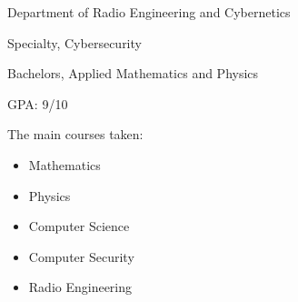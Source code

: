 

Department of Radio Engineering and Cybernetics

Specialty, Cybersecurity

Bachelors, Applied Mathematics and Physics 

GPA: 9/10

The main courses taken:

\begin{itemize}
	\item Mathematics %
	\item Physics %
	\item Computer Science %
	\item Computer Security %
	\item Radio Engineering %
\end{itemize}

\divider